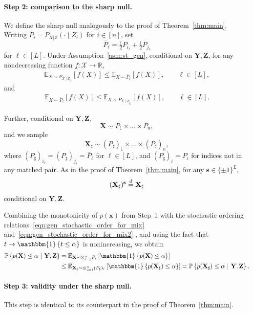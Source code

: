 \documentclass[12pt]{article}
\newcommand{\R}{\mathbb{R}}
\newcommand{\Ep}[2]{\mathbb{E}_{{#1}}\left[{#2}\right]}
\newcommand{\PPst}[2]{\mathbb{P}\left\{{#1}\  \middle| \ {#2}\right\}}
\newcommand{\eqd}{\stackrel{\textnormal{d}}{=}}
\newcommand{\One}[1]{{\mathbbm{1}}\left\{{#1}\right\}}
\newcommand{\Xcal}{\mathcal{X}}
\newcommand{\bs}{\mathbf{s}}
\newcommand{\bx}{\mathbf{x}}
\newcommand{\bX}{\mathbf{X}}
\newcommand{\bY}{\mathbf{Y}}
\newcommand{\bZ}{\mathbf{Z}}
\begin{document}
\paragraph{Step 2: comparison to the sharp null.}
We define the sharp null analogously to the proof of Theorem~\ref{thm:main}. Writing $P_i = P_{X|Z}(\cdot\mid Z_i)$ for $i\in [n]$, set 
\[
\bar{P}_\ell = \tfrac{1}{2}P_{i_\ell}+ \tfrac{1}{2}P_{j_\ell}
\]
for $\ell\in[L]$.  Under Assumption~\ref{asm:st_gen}, conditional on $\bY,\bZ$, for any nondecreasing function $f:\Xcal \to \R$,
\begin{align}\label{eqn:gen_stochastic_order_for_mix}
    \Ep{X\sim P_{X\mid Z_{i_\ell}}}{f(X)}\le\Ep{X\sim \bar{P}_\ell}{f(X)}, \qquad \ell\in[L],
    \end{align}
    and
 \begin{align}   
 \label{eqn:gen_stochastic_order_for_mix2}
    \Ep{X\sim \bar{P}_\ell}{f(X)} \le \Ep{X\sim P_{X\mid Z_{j_\ell}}}{f(X)}, \qquad \ell\in[L].
\end{align}


Further, conditional on $\bY,\bZ$,
\[
\bX \sim  P_1\times \dots \times P_n,
\]
and we sample
\[
\bX_{\sharp} \sim (P_\sharp)_1 \times \dots\times (P_\sharp)_n,
\]
where $(P_\sharp)_{i_\ell} = (P_\sharp)_{j_\ell} = \bar{P}_\ell$ for $\ell\in[L]$, and $(P_\sharp)_i=P_i$ for indices not in any matched pair. As in the proof of Theorem~\ref{thm:main}, for any $\bs\in\{\pm 1\}^L$,
\[
(\bX_\sharp)^\bs \eqd \bX_\sharp
\]
conditional on $\bY,\bZ$.

Combining the monotonicity of $p(\bx)$ from Step~1 with the stochastic ordering relations~\eqref{eqn:gen_stochastic_order_for_mix} and~\eqref{eqn:gen_stochastic_order_for_mix2} , and using the fact that $t\mapsto\One{t\le \alpha}$ is nonincreasing, we obtain 
\begin{align*}
   \PPst{p(\bX)\leq \alpha}{\bY,\bZ}
   &=\Ep{\bX\sim \otimes_{i=1}^n P_i}{\One{p(\bX)\le \alpha}}\\
   &\leq \Ep{\bX_\sharp\sim \otimes_{i=1}^n (P_\sharp)_i}{\One{p(\bX_\sharp)\le \alpha}}
   =\PPst{p(\bX_\sharp)\leq \alpha}{\bY,\bZ}.
\end{align*}

\paragraph{Step 3: validity under the sharp null.}
This step is identical to its counterpart in the proof of Theorem~\ref{thm:main}.
\end{document}
